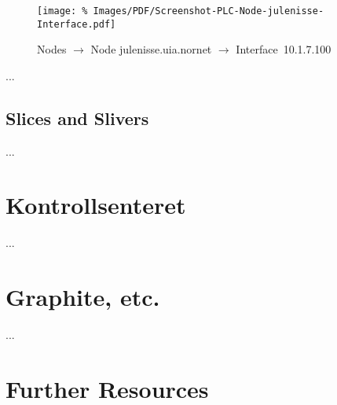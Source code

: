 \begin{figure*}
\begin{center}
\texttt{[image: \%
   Images/PDF/Screenshot-PLC-Node-julenisse-Interface.pdf]}
\end{center}
\caption{Nodes $\rightarrow$ Node julenisse.uia.nornet $\rightarrow$ Interface~10.1.7.100}
\label{cap:PLC-Node-Interface-Details}
\end{figure*}


...


\subsection{Slices and Slivers}
\label{sub:Slices-and-Slivers}

...



\section{Kontrollsenteret}
\label{sec:Kontrollsenteret}

...



\section{Graphite, etc.}
\label{sec:...}

...



\section{Further Resources}

